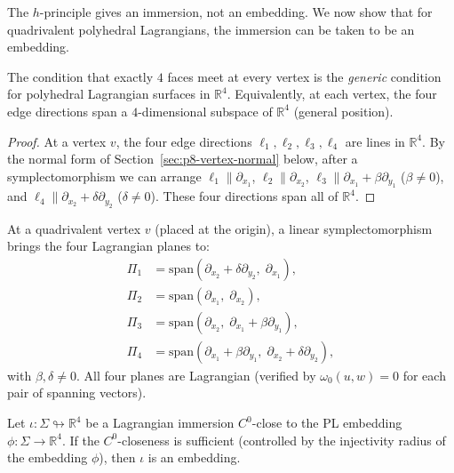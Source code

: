 The $h$-principle gives an immersion, not an embedding. We now show that
for quadrivalent polyhedral Lagrangians, the immersion can be taken to be
an embedding.

\begin{proposition}
\label{prop:p8-generic}
The condition that exactly $4$ faces meet at every vertex is the
\emph{generic} condition for polyhedral Lagrangian surfaces in
$\mathbb{R}^4$. Equivalently, at each vertex, the four edge directions span
a $4$-dimensional subspace of $\mathbb{R}^4$ (general position).
\end{proposition}

\begin{proof}
At a vertex $v$, the four edge directions $\ell_1,\ell_2,\ell_3,\ell_4$
are lines in $\mathbb{R}^4$. By the normal form of
Section~\ref{sec:p8-vertex-normal} below, after a symplectomorphism we can
arrange $\ell_1\parallel\partial_{x_1}$,
$\ell_2\parallel\partial_{x_2}$,
$\ell_3\parallel\partial_{x_1}+\beta\partial_{y_1}$ ($\beta\ne 0$), and
$\ell_4\parallel\partial_{x_2}+\delta\partial_{y_2}$ ($\delta\ne 0$). These
four directions span all of $\mathbb{R}^4$.
\end{proof}

\begin{lemma}
\label{sec:p8-vertex-normal}
At a quadrivalent vertex $v$ (placed at the origin), a linear
symplectomorphism brings the four Lagrangian planes to:
\begin{align*}
\Pi_1 &= \mathrm{span}(\partial_{x_2}+\delta\partial_{y_2},\;
          \partial_{x_1}), \\
\Pi_2 &= \mathrm{span}(\partial_{x_1},\;\partial_{x_2}), \\
\Pi_3 &= \mathrm{span}(\partial_{x_2},\;
          \partial_{x_1}+\beta\partial_{y_1}), \\
\Pi_4 &= \mathrm{span}(\partial_{x_1}+\beta\partial_{y_1},\;
          \partial_{x_2}+\delta\partial_{y_2}),
\end{align*}
with $\beta,\delta\ne 0$. All four planes are Lagrangian (verified by
$\omega_0(u,w)=0$ for each pair of spanning vectors).
\end{lemma}

\begin{theorem}
\label{thm:p8-embedding}
Let $\iota: \Sigma\looparrowright\mathbb{R}^4$ be a Lagrangian immersion
$C^0$-close to the PL embedding $\phi: \Sigma\to\mathbb{R}^4$. If the
$C^0$-closeness is sufficient (controlled by the injectivity radius of the
embedding $\phi$), then $\iota$ is an embedding.
\end{theorem}

